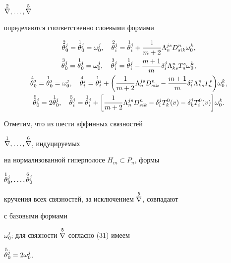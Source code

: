 $\overset{2}{\nabla}{},\dotsc,\overset{5}{\nabla}{}$ 


определяются соответственно слоевыми формами 


\begin{gather} 


\up{\,2}{\theta}^j_0=\up{\,1}{\theta}^j_0=\omega^j_0,\quad 


\up{\,2}{\theta}^j_i=\up{\,1}{\theta}^j_i+\frac{1}{m+2} 


\Lambda^{j s}_n D^n_{s i k}\omega^k_0,\\ 


%


\up{\,3}{\theta}^j_0=\up{\,1}{\theta}^j_0=\omega^j_0,\quad 


\up{\,3}{\theta}^j_i=\up{\,1}{\theta}^j_i-\frac{m+1}{m} 


\delta^j_i\Lambda^n_{k s}T^s_n\omega^k_0,\\ 


%


\up{\,4}{\theta}^j_0=\up{\,1}{\theta}^j_0=\omega^j_0,\quad 


\up{\,4}{\theta}^j_i=\up{\,1}{\theta}^j_i+\bigg(\frac{1}{m+2} 


\Lambda^{j s}_n D^n_{s i k}-\frac{m+1}{m}\delta^j_i 


\Lambda^n_{k s}T^s_n\bigg)\omega^k_0,\\ 


%


\up{\,5}{\theta}^j_0=2\up{\,1}{\theta}^j_0,\quad 


\up{\,5}{\theta}^j_i=\up{\,1}{\theta}^j_i+\bigg[\frac{1}{m+2} 


\Lambda^{j s}_n D^n_{ s i k}-\delta^j_i T^0_k(v)- 


\delta^j_k T^0_i(v)\bigg]\omega^k_0. 


\end{gather} 


Отметим, что из шести аффинных связностей


$\overset{1}{\nabla}{},\dotsc,\overset{6}{\nabla}{}$, индуцируемых 


на нормализованной гиперполосе $H_m\subset P_n$, формы 


$\overset{1}{\theta}{}^j_0,\dotsc,\overset{6}{\theta}{}^j_0$


кручения всех связностей, за исключением $\overset{5}{\nabla}{}$, совпадают


с базовыми формами 


$\omega^j_0$; для связности $\overset{5}{\nabla}{}$ согласно (31) имеем 


$\overset{\,5}{\theta}{}^j_0=2\omega^j_0$. 



